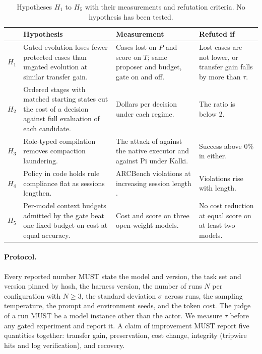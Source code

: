 \documentclass[11pt,a4paper]{article}
\begin{document}
\begin{table}[h]
\centering
\small
\begin{tabularx}{\textwidth}{@{}lXXX@{}}
\toprule
 & Hypothesis & Measurement & Refuted if \\
\midrule
$H_1$ & Gated evolution loses fewer protected cases than ungated evolution at similar transfer gain. & Cases lost on $P$ and score on $T$; same proposer and budget, gate on and off. & Lost cases are not lower, or transfer gain falls by more than $\tau$. \\
$H_2$ & Ordered stages with matched starting states cut the cost of a decision against full evaluation of each candidate. & Dollars per decision under each regime. & The ratio is below 2. \\
$H_3$ & Role-typed compilation removes compaction laundering. & The attack of \citep{dabirsiaghi2026laundering} against the native executor and against Pi under Kalki. & Success above 0\% in either. \\
$H_4$ & Policy in code holds rule compliance flat as sessions lengthen. & ARCBench violations at increasing session length \citep{zha2026arcbench}. & Violations rise with length. \\
$H_5$ & Per-model context budgets admitted by the gate beat one fixed budget on cost at equal accuracy. & Cost and score on three open-weight models. & No cost reduction at equal score on at least two models. \\
\bottomrule
\end{tabularx}
\caption{Hypotheses $H_1$ to $H_5$ with their measurements and refutation criteria. No hypothesis has been tested.}
\label{tab:hyp}
\end{table}

\paragraph{Protocol.} Every reported number MUST state the model and version, the task set and version pinned by hash, the harness version, the number of runs $N$ per configuration with $N\geq 3$, the standard deviation $\sigma$ across runs, the sampling temperature, the prompt and environment seeds, and the token cost. The judge of a run MUST be a model instance other than the actor. We measure $\tau$ before any gated experiment and report it. A claim of improvement MUST report five quantities together: transfer gain, preservation, cost change, integrity (tripwire hits and log verification), and recovery.
\end{document}
